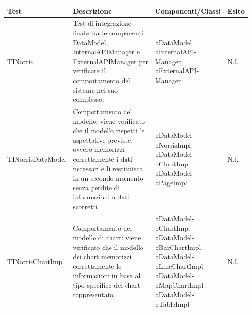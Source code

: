 \begin{longtabu}{| X | X | X[0.9] | X[0.3] |}

			\hline
			\rowfont{\bf}
			Test &
			Descrizione &
			Componenti/Classi &
			Esito \\
			\hline \endhead




	TINorris
	&
Test di integrazione finale tra le componenti DataModel, InternalAPIManager e ExternalAPIManager per verificare il comportamento del sistema nel suo complesso.
& \parbox[t]{0.6\textwidth}{
::DataModel\\
::InternalAPI-\\Manager\\
::ExternalAPI-\\Manager}
			& N.I.
			\\ \hline



	TINorrisDataModel
	&
Comportamento del modello: viene verificato che il modello rispetti le aspettative previste, ovvero memorizzi correttamente i dati necessari e li restituisca in un secondo momento senza perdite di informazioni o dati scorretti.
& \parbox[t]{0.6\textwidth}{
::DataModel-\\::NorrisImpl\\
::DataModel-\\::ChartImpl\\
::DataModel-\\::PageImpl}
			& N.I.
			\\ \hline



	TINorrisChartImpl
	&
Comportamento del modello di chart: viene verificato che il modello dei chart memorizzi correttamente le informazioni in base al tipo specifico del chart rappresentato.
& \parbox[t]{0.6\textwidth}{
::DataModel-\\::ChartImpl\\
::DataModel-\\::BarChartImpl\\
::DataModel-\\::LineChartImpl\\
::DataModel-\\::MapChartImpl\\
::DataModel-\\::TableImpl}
			& N.I.
			\\ \hline




\end{longtabu}
